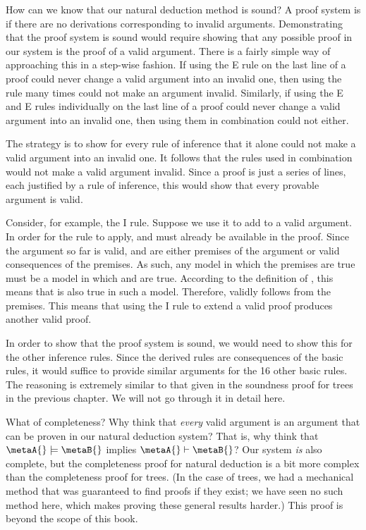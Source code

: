 How can we know that our natural deduction method is sound? A proof system is  if there are no derivations corresponding to invalid arguments. Demonstrating that the proof system is sound would require showing that any possible proof in our system is the proof of a valid argument. There is a fairly simple way of approaching this in a step-wise fashion. If using the {\eand}E rule on the last line of a proof could never change a valid argument into an invalid one, then using the rule many times could not make an argument invalid. Similarly, if using the {\eand}E and {\eor}E rules individually on the last line of a proof could never change a valid argument into an invalid one, then using them in combination could not either.

The strategy is to show for every rule of inference that it alone could not make a valid argument into an invalid one. It follows that the rules used in combination would not make a valid argument invalid. Since a proof is just a series of lines, each justified by a rule of inference, this would show that every provable argument is valid.

Consider, for example, the {\eand}I rule. Suppose we use it to add \metaA{}\eand\metaB{} to a valid argument. In order for the rule to apply, \metaA{} and \metaB{} must already be available in the proof. Since the argument so far is valid, \metaA{} and \metaB{} are either premises of the argument or valid consequences of the premises. As such, any model in which the premises are true must be a model in which \metaA{} and \metaB{} are true. According to the definition of , this means that \metaA{}\eand\metaB{} is also true in such a model. Therefore, \metaA{}\eand\metaB{} validly follows from the premises. This means that using the {\eand}I rule to extend a valid proof produces another valid proof.

In order to show that the proof system is sound, we would need to show this for the other inference rules. Since the derived rules are consequences of the basic rules, it would suffice to provide similar arguments for the 16 other basic rules. The reasoning is extremely similar to that given in the soundness proof for trees in the previous chapter. We will not go through it in detail here.

What of completeness? Why think that \emph{every} valid argument is an argument that can be proven in our natural deduction system? That is, why think that $\metaA{}\models\metaB{}$ implies $\metaA{}\vdash\metaB{}$? Our system \emph{is} also complete, but the completeness proof for natural deduction is a bit more complex than the completeness proof for trees. (In the case of trees, we had a mechanical method that was guaranteed to find proofs if they exist; we have seen no such method here, which makes proving these general results harder.) This proof is beyond the scope of this book.

